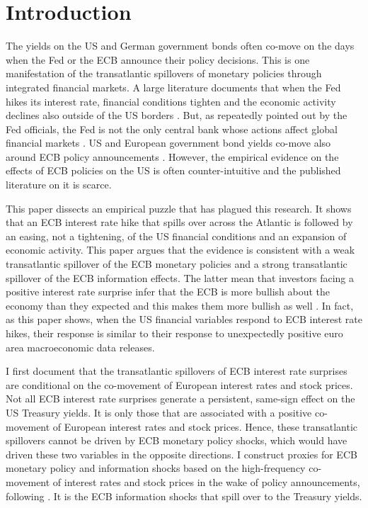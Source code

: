 \documentclass[a4paper,12pt]{article}
\begin{document}
\section{Introduction}

The yields on the US and German government bonds often co-move on the days when the Fed or the ECB announce their policy decisions.
This is one manifestation of the transatlantic spillovers of monetary policies through integrated financial markets.
A large literature documents that when the Fed hikes its interest rate, financial conditions tighten and the economic activity declines also outside of the US borders \citep[][and many others]{Rey_2013,MirandaAgrippino_Rey_2020}. 
But, as repeatedly pointed out by the Fed officials, the Fed is not the only central bank whose actions affect global financial markets \citep[e.g.][]{Powell_2018,Clarida_2021}.
US and European government bond yields co-move also around ECB policy announcements \citep[e.g.][]{Curcuru_etal_2018}.
However, the empirical evidence on the effects of ECB policies on the US is often counter-intuitive and the published literature on it is scarce.

This paper dissects an empirical puzzle that has plagued this research. It
shows that an ECB interest rate hike that spills over across the Atlantic is followed
by an easing, not a tightening, of the US financial conditions and an expansion of economic activity.
This paper argues that the evidence is consistent with a weak transatlantic spillover of the ECB monetary policies and
a strong transatlantic spillover of the ECB information effects. 
The latter mean that investors facing a positive interest rate
surprise infer that the ECB is more bullish about the economy than they expected and this makes them more bullish as well \citep{Romer_Romer_2000,Nakamura_Steinsson_2018}.
 In fact, as this paper shows, when the US financial variables respond to ECB interest rate hikes,
their response is similar to their response to unexpectedly positive euro area macroeconomic data releases.

I first document that the transatlantic spillovers of ECB interest rate surprises are conditional
on the co-movement of European interest rates and stock prices.
Not all ECB interest rate surprises generate a persistent, same-sign effect on the US Treasury yields.
It is only those that are associated with a positive co-movement of European interest rates and stock prices.
Hence, these transatlantic spillovers cannot be driven by ECB monetary policy shocks,
which would have driven these two variables in the opposite directions.
I construct proxies for ECB monetary policy and information shocks based on the
high-frequency co-movement of interest rates and stock prices in the wake of policy announcements, following \cite{Jarocinski_Karadi_2020}.
It is the ECB information shocks that spill over to the Treasury yields.
\end{document}
